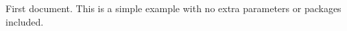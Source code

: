\documentclass{article}
\begin{document}
First document. This is a simple example with no
extra parameters or packages included.
\end{document}
